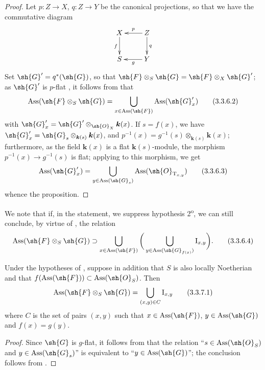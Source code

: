 \begin{proof}
Let $p:Z\to X$, $q:Z\to Y$ be the canonical projections, so that we have the commutative diagram
\[
\xymatrix{
X\ar[d]_{f} & Z\ar[l]_{p}\ar[d]^{q}\\
S & Y\ar[l]^{g}
}
\]
Set $\sh{G}'=q^*(\sh{G})$, so that $\sh{F}\otimes_S\sh{G}=\sh{F}\otimes_X\sh{G}'$; as $\sh{G}'$ is $p$-flat , it follows from  that
\[
\label{IV.3.3.6.2}
\operatorname{Ass}(\sh{F}\otimes_S\sh{G})=\bigcup_{x\in\operatorname{Ass}(\sh{F})}\operatorname{Ass}(\sh{G}'_x)
\tag{3.3.6.2}
\]
with $\sh{G}'_x=\sh{G}'\otimes_{\sh{O}_X}\boldsymbol{k}(x)$.
If $s=f(x)$, we have $\sh{G}'_x=\sh{G}_s\otimes_{\boldsymbol{k}(s)}\boldsymbol{k}(x)$, and $p^{-1}(x)=g^{-1}(s)\otimes_{\boldsymbol{k}(s)}\boldsymbol{k}(x)$; furthermore, as the field $\boldsymbol{k}(x)$ is a flat $\boldsymbol{k}(s)$-module, the morphism $p^{-1}(x)\to g^{-1}(s)$ is flat; applying  to this morphism, we get
\[
\label{IV.3.3.6.3}
\operatorname{Ass}(\sh{G}'_x)=\bigcup_{y\in\operatorname{Ass}(\sh{G}_s)}\operatorname{Ass}(\sh{O}_{\mathrm{T}_{x,y}})
\tag{3.3.6.3}
\]
whence the proposition.
\end{proof}

We note that if, in the statement, we suppress hypothesis 2\textsuperscript{o}, we can still conclude, by virtue of , the relation
\[
\label{IV.3.3.6.4}
\operatorname{Ass}(\sh{F}\otimes_S\sh{G})\supset\bigcup_{x\in\operatorname{Ass}(\sh{F})}\bigg(\bigcup_{y\in\operatorname{Ass}(\sh{G}_{f(x)})}\mathrm{I}_{x,y}\bigg).
\tag{3.3.6.4}
\]

\begin{corollary}[3.3.7]
\label{IV.3.3.7}
Under the hypotheses of , suppose in addition that $S$ is also locally Noetherian and that $f(\operatorname{Ass}(\sh{F}))\subset\operatorname{Ass}(\sh{O}_S)$.
Then
\[
\label{IV.3.3.7.1}
\operatorname{Ass}(\sh{F}\otimes_S\sh{G})=\bigcup_{(x,y)\in C}\mathrm{I}_{x,y}
\tag{3.3.7.1}
\]
where $C$ is the set of pairs $(x,y)$ such that $x\in\operatorname{Ass}(\sh{F})$, $y\in\operatorname{Ass}(\sh{G})$ and $f(x)=g(y)$.
\end{corollary}

\begin{proof}
Since $\sh{G}$ is $g$-flat, it follows from  that the relation
``$s\in\operatorname{Ass}(\sh{O}_S)$ and $y\in\operatorname{Ass}(\sh{G}_s)$''
is equivalent to ``$y\in\operatorname{Ass}(\sh{G})$''; the conclusion follows from .
\end{proof}

